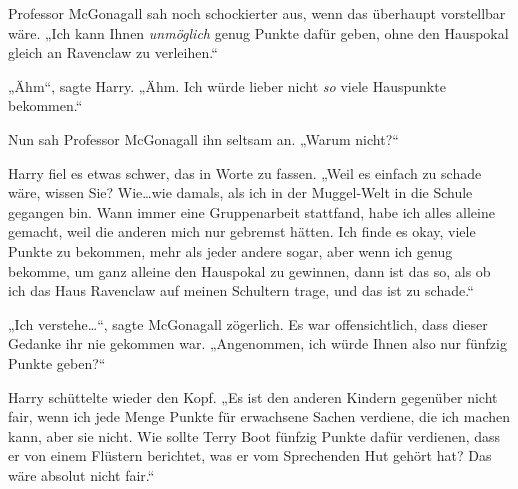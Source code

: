 Professor McGonagall sah noch schockierter aus, wenn das überhaupt vorstellbar wäre. „Ich kann Ihnen \emph{unmöglich} genug Punkte dafür geben, ohne den Hauspokal gleich an Ravenclaw zu verleihen.“

„Ähm“, sagte Harry. „Ähm. Ich würde lieber nicht \emph{so} viele Hauspunkte bekommen.“

Nun sah Professor McGonagall ihn seltsam an. „Warum nicht?“

Harry fiel es etwas schwer, das in Worte zu fassen. „Weil es einfach zu schade wäre, wissen Sie? Wie…wie damals, als ich in der Muggel-Welt in die Schule gegangen bin. Wann immer eine Gruppenarbeit stattfand, habe ich alles alleine gemacht, weil die anderen mich nur gebremst hätten. Ich finde es okay, viele Punkte zu bekommen, mehr als jeder andere sogar, aber wenn ich genug bekomme, um ganz alleine den Hauspokal zu gewinnen, dann ist das so, als ob ich das Haus Ravenclaw auf meinen Schultern trage, und das ist zu schade.“

„Ich verstehe…“, sagte McGonagall zögerlich. Es war offensichtlich, dass dieser Gedanke ihr nie gekommen war. „Angenommen, ich würde Ihnen also nur fünfzig Punkte geben?“

Harry schüttelte wieder den Kopf. „Es ist den anderen Kindern gegenüber nicht fair, wenn ich jede Menge Punkte für erwachsene Sachen verdiene, die ich machen kann, aber sie nicht. Wie sollte Terry Boot fünfzig Punkte dafür verdienen, dass er von einem Flüstern berichtet, was er vom Sprechenden Hut gehört hat? Das wäre absolut nicht fair.“

